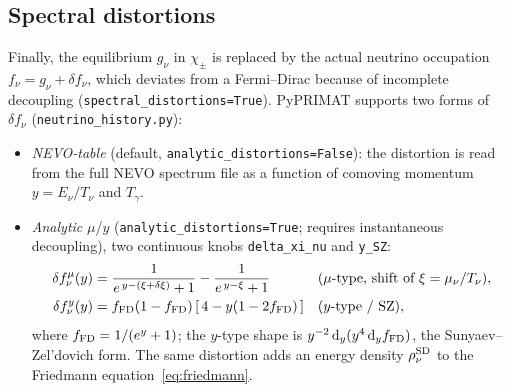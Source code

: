 \documentclass[11pt,a4paper]{article}
\newcommand{\dd}{\mathrm{d}}
\newcommand{\Tg}{T_\gamma}
\newcommand{\code}[1]{\texttt{#1}}
\begin{document}
\subsection*{Spectral distortions}
Finally, the equilibrium $g_\nu$ in $\chi_\pm$ is replaced by the actual neutrino
occupation $f_\nu=g_\nu+\delta f_\nu$, which deviates from a Fermi--Dirac because
of incomplete decoupling (\code{spectral\_distortions=True}). PyPRIMAT supports
two forms of $\delta f_\nu$ (\code{neutrino\_history.py}):
\begin{itemize}\itemsep2pt
  \item \emph{NEVO-table} (default, \code{analytic\_distortions=False}): the
    distortion is read from the full NEVO spectrum file as a function of comoving
    momentum $y=E_\nu/T_\nu$ and $\Tg$.
  \item \emph{Analytic} $\mu$/$y$ (\code{analytic\_distortions=True}; requires
    instantaneous decoupling), two continuous knobs \code{delta\_xi\_nu} and
    \code{y\_SZ}:
    \begin{align}
      \delta f^\mu_\nu(y) &= \frac{1}{e^{\,y-(\xi+\delta\xi)}+1}-\frac{1}{e^{\,y-\xi}+1}
        && (\mu\text{-type, shift of }\xi=\mu_\nu/T_\nu),\\
      \delta f^y_\nu(y) &= f_{\rm FD}(1-f_{\rm FD})\,[\,4-y(1-2f_{\rm FD})\,]
        && (y\text{-type / SZ}),
    \end{align}
    where $f_{\rm FD}=1/(e^y+1)$; the $y$-type shape is
    $y^{-2}\,\dd_y(y^4\,\dd_y f_{\rm FD})$, the Sunyaev--Zel'dovich form. The same
    distortion adds an energy density $\rho_\nu^{\rm SD}$ to the Friedmann
    equation~\eqref{eq:friedmann}.
\end{itemize}

\end{document}
